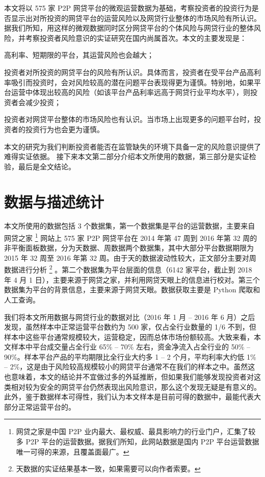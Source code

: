 \documentclass[lang=cn,11pt]{elegantpaper}
\begin{document}
本文将以 575 家 P2P 网贷平台的微观运营数据为基础，考察投资者的投资行为是否显示出对所投资的网贷平台的运营风险以及网贷行业整体的市场风险有所认识。据我们所知，用这样的微观数据同时区分网贷平台的个体风险与网贷行业的整体风险，并考察投资者风险意识的实证研究在国内尚属首次。本文的主要发现是：
\begin{enumerate*}[label=（\arabic*）]
\item 高利率、短期限的平台，其运营风险也会越大；
\item 投资者对所投资的网贷平台的风险有所认识。具体而言，投资者在受平台产品高利率吸引而投资时，会对风险较高的潜在问题平台表现得更为谨慎。特别地，如果平台运营中体现出较高的风险（如该平台产品利率远高于网贷行业平均水平），则投资者会减少投资；
\item 投资者对网贷平台整体的市场风险也有认识。当市场上出现更多的问题平台时，投资者的投资行为也会更为谨慎。
\end{enumerate*}
本文的研究为我们判断投资者能否在监管缺失的环境下具备一定的风险意识提供了难得实证依据。
接下来本文第二部分介绍本文所使用的数据，第三部分是实证检验，最后是全文结论。

\section{数据与描述统计}

本文所使用的数据包括 3 个数据集，第一个数据集是平台的运营数据，主要来自网贷之家 \footnote{网贷之家是中国 P2P 业内最大、最权威、最具影响力的行业门户，汇集了较多 P2P 平台的运营数据。据我们所知，此网站数据是国内 P2P 平台运营数据唯一可得的来源，且覆盖面最广。} 网站上 575 家 P2P 网贷平台在 2014 年第 47 周到 2016 年第 32 周的非平衡面板数据，分为天数据、周数据两个数据集，其中大部分平台数据期限为 2015 年 32 周至 2016 年第 32 周。由于天的数据波动性较大，正文部分主要对周数据进行分析 \footnote{天数据的实证结果基本一致，如果需要可以向作者索要。} 。第二个数据集为平台层面的信息（6142 家平台，截止到 2018 年 4 月 1 日），主要来源于网贷之家，并利用网贷天眼上的信息进行校对。第三个数据集为平台的背景信息，主要来源于网贷天眼。数据获取主要是 Python 爬取和人工查询。

我们将本文所用数据与网贷行业的数据对比（2016 年 1 月 -- 2016 年 6 月）之后发现，虽然样本中正常运营平台数约为 500 家，仅占全行业数量的 1/6 不到，但样本中这些平台通常规模较大，运营稳定，因而总体市场份额较高。大致来看，本文样本中平台成交量占全行业 65\% -- 70\% 左右，资金净流入占全行业的 50\% -- 90\%。样本平台产品的平均期限比全行业大约多 1 -- 2 个月，平均利率大约低 1\% -- 2\%，这是由于风险较高规模较小的网贷平台通常不在我们的样本之中。虽然这也意味着，本文的结论并不宜做过多的外延推断，但如果我们能够发现投资者对这类相对较为安全的网贷平台仍然表现出风险意识，那么这个发现无疑是有意义的。此外，鉴于数据样本可得性，我们认为本文样本是目前可得的数据中，最能代表大部分正常运营平台的。
\end{document}
